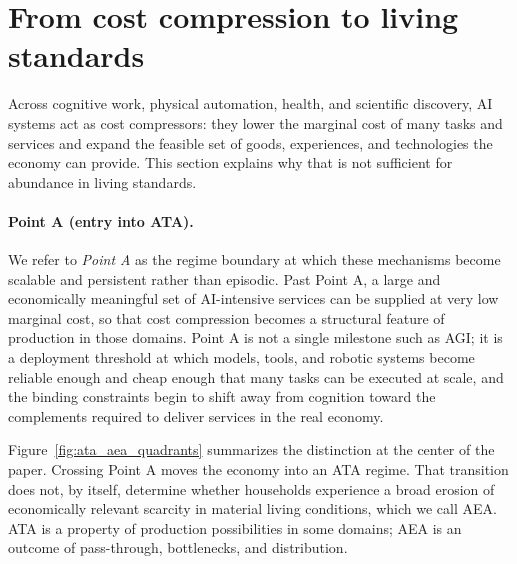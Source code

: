 \documentclass[11pt]{article}
\begin{document}
\section{From cost compression to living standards}
\label{sec:ata_not_aea}

Across cognitive work, physical automation, health, and scientific discovery, AI systems act as cost compressors: they lower the marginal cost of many tasks and services and expand the feasible set of goods, experiences, and technologies the economy can provide. This section explains why that is not sufficient for abundance in living standards.

\paragraph{Point A (entry into ATA).}
We refer to \emph{Point A} as the regime boundary at which these mechanisms become scalable and persistent rather than episodic. Past Point A, a large and economically meaningful set of AI-intensive services can be supplied at very low marginal cost, so that cost compression becomes a structural feature of production in those domains. Point A is not a single milestone such as AGI; it is a deployment threshold at which models, tools, and robotic systems become reliable enough and cheap enough that many tasks can be executed at scale, and the binding constraints begin to shift away from cognition toward the complements required to deliver services in the real economy.

Figure~\ref{fig:ata_aea_quadrants} summarizes the distinction at the center of the paper. Crossing Point A moves the economy into an ATA regime. That transition does not, by itself, determine whether households experience a broad erosion of economically relevant scarcity in material living conditions, which we call AEA. ATA is a property of production possibilities in some domains; AEA is an outcome of pass-through, bottlenecks, and distribution.
\end{document}
